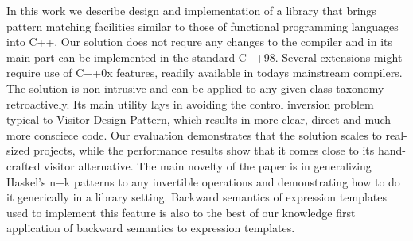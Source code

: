 \documentclass[submission,copyright]{eptcs}
\begin{document}
In this work we describe design and implementation of a library that brings 
pattern matching facilities similar to those of functional programming languages 
into C++. Our solution does not requre any changes to the compiler and in its 
main part can be implemented in the standard C++98. Several extensions might 
require use of C++0x features, readily available in todays mainstream compilers.
The solution is non-intrusive and can be applied to any given class taxonomy 
retroactively. Its main utility lays in avoiding the control inversion problem 
typical to Visitor Design Pattern, which results in more clear, direct and much 
more consciece code. Our evaluation demonstrates that the solution scales to 
real-sized projects, while the performance results show that it comes close to 
its hand-crafted visitor alternative. The main novelty of the paper is in 
generalizing Haskel's n+k patterns to any invertible operations and 
demonstrating how to do it generically in a library setting. Backward semantics 
of expression templates used to implement this feature is also to the best of 
our knowledge first application of backward semantics to expression templates.

\end{document}

